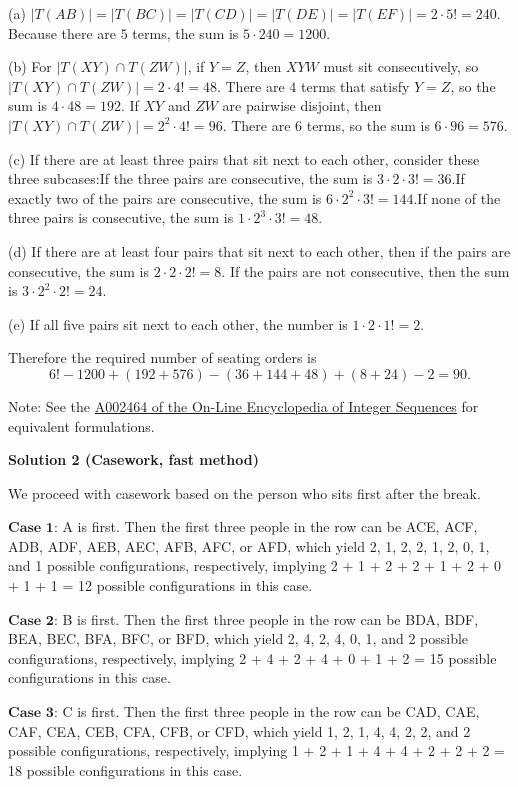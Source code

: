 \begin{enumerate}
 (a) $|T(AB)|=|T(BC)|=|T(CD)|=|T(DE)|=|T(EF)|=2\cdot5!=240.$ Because there are $5$ terms, the sum is $5\cdot240=1200$.

 (b) For $|T(XY)\cap T(ZW)|$, if $Y=Z$, then $XYW$ must sit consecutively, so $|T(XY)\cap T(ZW)|=2\cdot4!=48$. There are $4$ terms that satisfy $Y=Z$, so the sum is $4\cdot 48=192$. If $XY$ and $ZW$ are pairwise disjoint, then $|T(XY)\cap T(ZW)|=2^2\cdot4!=96$. There are $6$ terms, so the sum is $6\cdot96=576$.

 (c) If there are at least three pairs that sit next to each other, consider these three subcases:If the three pairs are consecutive, the sum is $3\cdot2\cdot3!=36$.If exactly two of the pairs are consecutive, the sum is $6\cdot2^2\cdot3!=144$.If none of the three pairs is consecutive, the sum is $1\cdot2^3\cdot3!=48.$

 (d) If there are at least four pairs that sit next to each other, then if the pairs are consecutive, the sum is $2\cdot2\cdot2!=8$. If the pairs are not consecutive, then the sum is $3\cdot2^2\cdot2!=24$.

 (e) If all five pairs sit next to each other, the number is $1\cdot2\cdot1!=2$.

 Therefore the required number of seating orders is
 \[6!-1200+(192+576)-{(36+144+48)+(8+24)-2}=90.\]

 Note: See the \href{https://oeis.org/A002464}{A002464 of the On-Line Encyclopedia of Integer Sequences} for equivalent formulations.

 



\textbf{Solution 2 (Casework, fast method)}

We proceed with casework based on the person who sits first after the break.

 $\textbf{Case 1:}$ A is first. Then the first three people in the row can be ACE, ACF, ADB, ADF, AEB, AEC, AFB, AFC, or AFD, which yield 2, 1, 2, 2, 1, 2, 0, 1, and 1 possible configurations, respectively, implying 2 + 1 + 2 + 2 + 1 + 2 + 0 + 1 + 1 = 12 possible configurations in this case.

 $\textbf{Case 2:}$ B is first. Then the first three people in the row can be BDA, BDF, BEA, BEC, BFA, BFC, or BFD, which yield 2, 4, 2, 4, 0, 1, and 2 possible configurations, respectively, implying 2 + 4 + 2 + 4 + 0 + 1 + 2 = 15 possible configurations in this case.

 $\textbf{Case 3:}$ C is first. Then the first three people in the row can be CAD, CAE, CAF, CEA, CEB, CFA, CFB, or CFD, which yield 1, 2, 1, 4, 4, 2, 2, and 2 possible configurations, respectively, implying 1 + 2 + 1 + 4 + 4 + 2 + 2 + 2 = 18 possible configurations in this case.


\end{enumerate}
